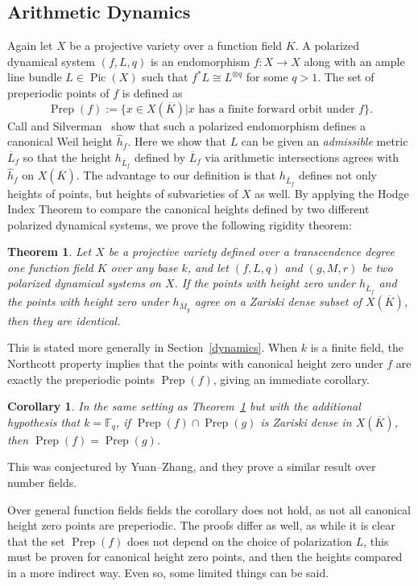 \documentclass[times, doublespace]{amsart}
\numberwithin{equation}{section}
\theoremstyle{plain}
\newtheorem{theorem}[equation]{Theorem}
\newtheorem{cor}[equation]{Corollary}
\theoremstyle{definition}
\DeclareMathOperator{\Pic}{Pic}
\DeclareMathOperator{\Prep}{Prep}
\newcommand{\F}{\mathbb{F}}
\begin{document}
 \subsection{Arithmetic Dynamics}
Again let $X$ be a projective variety over a function field $K$. A polarized dynamical system $(f,L,q)$ is an endomorphism $f:X\to X$ along with an ample line bundle $L\in\Pic(X)$ such that $f^*L\cong L^{\otimes q}$ for some $q>1$. 
The set of preperiodic points of $f$ is defined as
\[\Prep(f):=\{x\in X(\overline K)|x\text{ has a finite forward orbit under }f\}.\]
Call and Silverman~\cite{CS} show that such a polarized endomorphism defines a canonical Weil height $\widehat h_f$. Here we show that $L$ can be given an \emph{admissible} metric $\overline L_f$ so that the height $h_{\overline L_f}$ defined by $\overline L_f$ via arithmetic intersections agrees with $\widehat h_f$ on $X(\overline K)$. The advantage to our definition is that $h_{\overline L_f}$ defines not only heights of points, but heights of subvarieties of $X$ as well. By applying the Hodge Index Theorem to compare the canonical heights defined by two different polarized dynamical systems, we prove the following rigidity theorem:

\begin{theorem}\label{introdynamicsthm}
Let $X$ be a projective variety defined over a transcendence degree one function field $K$ over any base $k$, and let $(f,L,q)$ and $(g,M,r)$ be two polarized dynamical systems on $X$. If the points with height zero under $h_{\overline L_f}$ and the points with height zero under $h_{\overline M_g}$ agree on a Zariski dense subset of $X(\overline K)$, then they are identical.
\end{theorem}

This is stated more generally in Section~\ref{dynamics}. When $k$ is a finite field, the Northcott property implies that the points with canonical height zero under $f$ are exactly the preperiodic points $\Prep(f)$, giving an immediate corollary. 

\begin{cor}\label{dynamicsthmfinite}
In the same setting as Theorem~\ref{introdynamicsthm} but with the additional hypothesis that $k=\F_q$, if $\Prep(f)\cap\Prep(g)$ is Zariski dense in $X(\overline K)$, then $\Prep(f)=\Prep(g)$.
\end{cor}

This was conjectured by Yuan--Zhang, and they prove a similar result over number fields.

Over general function fields fields the corollary does not hold, as not all canonical height zero points are preperiodic. The proofs differ as well, as while it is clear that the set $\Prep(f)$ does not depend on the choice of polarization $L$, this must be proven for canonical height zero points, and then the heights compared in a more indirect way. Even so, some limited things can be said.
\end{document}

